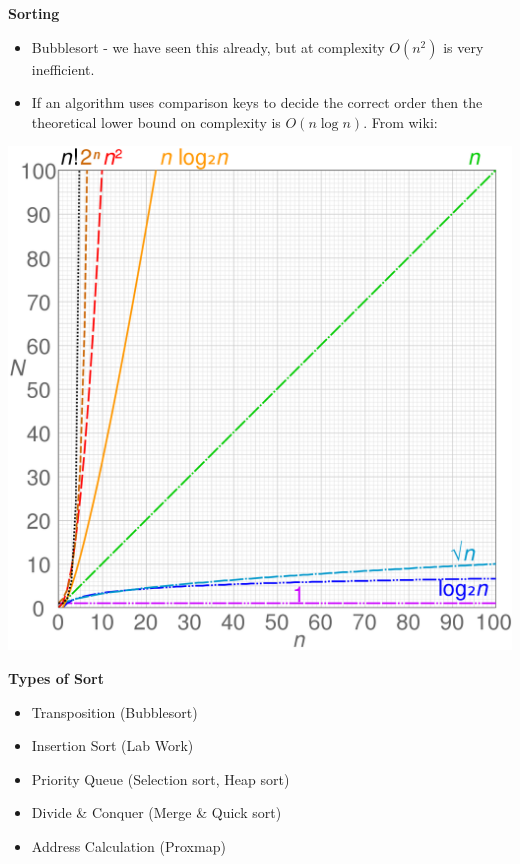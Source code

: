 \documentclass[a4,portraitt]{slides}
\begin{document}




\newpage
{\samepage
\begin{center}
{\Large{\bf Sorting}}
\end{center}
\begin{itemize}
\item Bubblesort - we have seen this already, but at complexity $O(n^2)$ is
very inefficient.
\item If an algorithm uses comparison keys to decide the correct order
then the theoretical lower bound on complexity is $O(n \log n )$. From
wiki:
\end{itemize}
\begin{center}
\includegraphics[width=\textwidth]{../Images/1280px-Comparison_computational_complexity.png}
\end{center}

}

\newpage
{\samepage
\begin{center}
{\Large{\bf Types of Sort}}
\end{center}
\begin{itemize}
\item Transposition (Bubblesort)
\item Insertion Sort (Lab Work)
\item Priority Queue (Selection sort, Heap sort)
\item Divide \& Conquer (Merge \& Quick sort)
\item Address Calculation (Proxmap)
\end{itemize}
}
\end{document}
